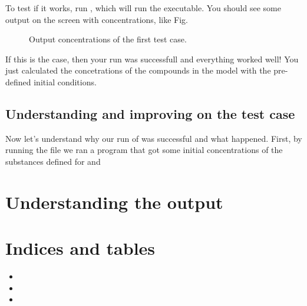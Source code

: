 \documentclass[letterpaper,10pt,openany,oneside]{sphinxmanual}
\begin{document}
To test if it works, run , which will run the executable.
You should see some output on the screen with concentrations, like Fig. {\hyperref[running:test1\string-output]{}}
\begin{figure}[htbp]
\centering
\capstart

\noindent{}
\caption{Output concentrations of the first test case.}\label{running:test1-output}\label{running:id1}\end{figure}

If this is the case, then your run was successfull and everything worked well!
You just calculated the concetrations of the compounds in the 
model with the pre-defined initial conditions.


\section{Understanding and improving on the test case}
\label{running:understanding-and-improving-on-the-test-case}
Now let's understand why our run of  was successful and what
happened. First, by running the  file we ran a program that got some initial
concentrations of the substances defined for  and


\chapter{Understanding the output}
\label{output::doc}\label{output:understanding-the-output}

\chapter{Indices and tables}
\label{index:indices-and-tables}\begin{itemize}
\item {} 

\item {} 

\item {} 

\end{itemize}



\renewcommand{\indexname}{Index}
\printindex
\end{document}
